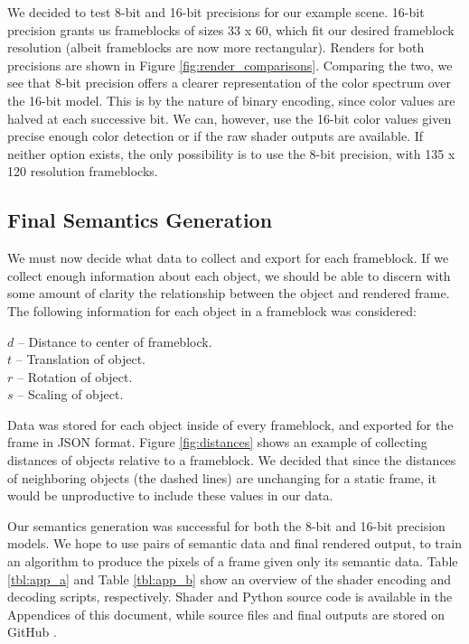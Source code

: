 \documentclass[conference]{IEEEtran}
\begin{document}
We decided to test 8-bit and 16-bit precisions for our example scene.
16-bit precision grants us frameblocks of sizes 33 x 60,
which fit our desired frameblock resolution (albeit frameblocks are now more rectangular).
Renders for both precisions are shown in
Figure \ref{fig:render_comparisons}.
Comparing the two, we see that 8-bit precision offers a clearer representation
of the color spectrum over the 16-bit model.
This is by the nature of binary encoding,
since color values are halved at each successive bit.
We can, however, use the 16-bit color values
given precise enough color detection
or if the raw shader outputs are available.
If neither option exists, the only possibility is to use the 8-bit precision,
with 135 x 120 resolution frameblocks.

\subsection{Final Semantics Generation}
We must now decide what data to collect and export for each frameblock.
If we collect enough information about each object,
we should be able to discern with some amount of clarity
the relationship between the object and rendered frame.
The following information for each object in a frameblock was considered:
\bigskip
\begin{adjustwidth}{2.5em}{0pt}
$d$ -- Distance to center of frameblock. \\
$t$ -- Translation of object. \\
$r$ -- Rotation of object. \\
$s$ -- Scaling of object. \\
\end{adjustwidth}
\bigskip
Data was stored for each object inside of every frameblock,
and exported for the frame in JSON format.
Figure \ref{fig:distances} shows an example of collecting
distances of objects relative to a frameblock.
We decided that since the distances of neighboring objects (the dashed lines)
are unchanging for a static frame, it would be unproductive to include these values
in our data.

Our semantics generation was successful for both the 8-bit and 16-bit precision models.
We hope to use pairs of semantic data and final rendered output,
to train an algorithm to produce the pixels of a frame given only its semantic data.
Table \ref{tbl:app_a} and Table \ref{tbl:app_b} show an overview of
the shader encoding and decoding scripts, respectively.
Shader and Python source code is available in the Appendices of this document,
while source files and final outputs are stored on GitHub \cite{thesis_harris}.
\end{document}
